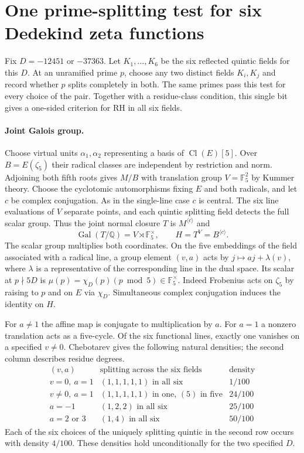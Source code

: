 \section{One prime-splitting test for six Dedekind zeta functions}\label{sec:joint-test}

Fix $D=-12451$ or $-37363$. Let $K_1,\ldots,K_6$ be the six reflected
quintic fields for this $D$. At an unramified prime $p$, choose any two
distinct fields $K_i,K_j$ and record whether $p$ splits completely in
both. The same primes pass this test for every choice of the pair.
Together with a residue-class condition, this single bit gives a
one-sided criterion for RH in all six fields.

\paragraph{Joint Galois group.}
Choose virtual units $\alpha_1,\alpha_2$ representing a basis of
$\operatorname{Cl}(E)[5]$. Over $B=E(\zeta_5)$ their radical classes
are independent by restriction and norm. Adjoining both fifth roots
gives $M/B$ with translation group $V=\mathbb F_5^2$ by Kummer theory.
Choose the cyclotomic automorphisms fixing $E$ and both radicals,
and let $c$ be complex conjugation. As in the single-line case $c$ is
central. The six line evaluations of $V$ separate points, and each
quintic splitting field detects the full scalar group. Thus the joint
normal closure $T$ is $M^{\langle c\rangle}$ and
\[
 \operatorname{Gal}(T/\mathbb Q)
   = V\rtimes\mathbb F_5^\times,\qquad
 H=T^V=B^{\langle c\rangle}.
\]
The scalar group multiplies both coordinates. On the five embeddings
of the field associated with a radical line, a group element $(v,a)$
acts by $j\mapsto aj+\lambda(v)$, where $\lambda$ is a representative of the corresponding
line in the dual space. Its scalar at $p\nmid5D$ is
$\mu(p)=\chi_D(p)(p\bmod 5)\in\mathbb F_5^\times$.
Indeed Frobenius acts on $\zeta_5$ by raising to $p$ and on $E$ via
$\chi_D$. Simultaneous complex conjugation induces the identity on $H$.

For $a\ne1$ the affine map is conjugate to multiplication by $a$.
For $a=1$ a nonzero translation acts as a five-cycle. Of the six
functional lines, exactly one vanishes on a specified $v\ne0$.
Chebotarev gives the following natural densities; the second column
describes residue degrees.
\[
\begin{array}{lll}
 (v,a) & \text{splitting across the six fields} & \text{density}\\
 \hline
 v=0,\ a=1 & (1,1,1,1,1)\text{ in all six} & 1/100\\
 v\ne0,\ a=1 & (1,1,1,1,1)\text{ in one, }(5)\text{ in five}
      & 24/100\\
 a=-1 & (1,2,2)\text{ in all six} & 25/100\\
 a=2\text{ or }3 & (1,4)\text{ in all six} & 50/100
\end{array}
\]
Each of the six choices of the uniquely splitting quintic in the
second row occurs with density $4/100$. These densities hold
unconditionally for the two specified $D$.

